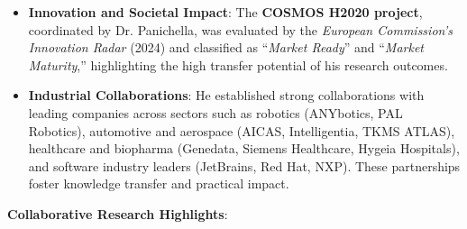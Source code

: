 \documentclass[11pt]{article}
\begin{document}
\begin{itemize}
 \item 
    \textbf{Innovation and Societal Impact}: The \textbf{COSMOS H2020 project}, coordinated by Dr. Panichella, was evaluated by the \textit{European Commission's Innovation Radar} (2024) and classified as “\textit{Market Ready}” and “\textit{Market Maturity},” highlighting the high transfer potential of his research outcomes.
 \vspace{-2.5mm}
 \item 
    \textbf{Industrial Collaborations}: He established strong collaborations with leading companies across sectors such as robotics (ANYbotics, PAL Robotics), automotive and aerospace (AICAS, Intelligentia, TKMS ATLAS), healthcare and biopharma (Genedata, Siemens Healthcare, Hygeia Hospitals), and software industry leaders (JetBrains, Red Hat, NXP). These partnerships foster knowledge transfer and practical impact. 
 \vspace{-2.5mm}
\end{itemize}


 \textbf{Collaborative Research Highlights}:
 
\end{document}
